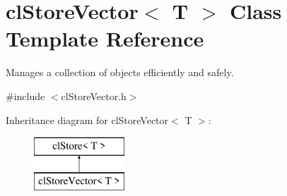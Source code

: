 \hypertarget{classcl_store_vector}{
\section{clStoreVector$<$ T $>$ Class Template Reference}
\label{classcl_store_vector}
}


Manages a collection of objects efficiently and safely.  




{\ttfamily \#include $<$clStoreVector.h$>$}

Inheritance diagram for clStoreVector$<$ T $>$:\begin{figure}[H]
\begin{center}
\leavevmode
\includegraphics[height=2.000000cm]{classcl_store_vector}
\end{center}
\end{figure}
